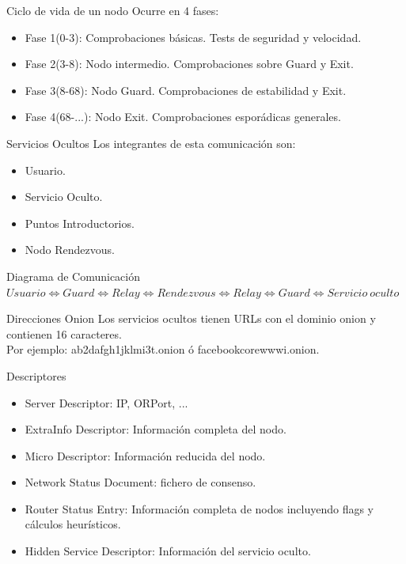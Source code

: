 \documentclass[10pt]{beamer}
\begin{document}
\begin{frame}[fragile]{Ciclo de vida de un nodo}
	\pause
	Ocurre en 4 fases:
	\pause
	\begin{itemize}
		\item<1-> Fase 1(0-3): Comprobaciones básicas. Tests de seguridad y velocidad.\pause
		\item<2-> Fase 2(3-8): Nodo intermedio. Comprobaciones sobre Guard y Exit.\pause
		\item<3-> Fase 3(8-68): Nodo Guard. Comprobaciones de estabilidad y Exit.\pause
		\item<4-> Fase 4(68-...): Nodo Exit. Comprobaciones esporádicas generales.\pause
	\end{itemize}
\end{frame}

\begin{frame}[fragile]{Servicios Ocultos}
	\pause
	Los integrantes de esta comunicación son:
	\pause
	\begin{itemize}
		\item<1-> Usuario.\pause
		\item<2-> Servicio Oculto.\pause
		\item<3-> Puntos Introductorios.\pause
		\item<4-> Nodo Rendezvous.\pause
	\end{itemize}
	\pause
	\begin{block}{Diagrama de Comunicación}
		\footnotesize $Usuario \Leftrightarrow Guard \Leftrightarrow Relay \Leftrightarrow Rendezvous \Leftrightarrow Relay \Leftrightarrow Guard \Leftrightarrow Servicio \ oculto$
	\end{block}
	\pause
	\begin{exampleblock}{Direcciones Onion}
		Los servicios ocultos tienen URLs con el dominio onion y contienen 16 caracteres.\\ Por ejemplo: ab2dafgh1jklmi3t.onion ó facebookcorewwwi.onion.
	\end{exampleblock}
\end{frame}

\begin{frame}[fragile]{Descriptores}
	\pause
	\begin{itemize}
		\item<1-> Server Descriptor: IP, ORPort, ... \pause
		\item<2-> ExtraInfo Descriptor: Información completa del nodo. \pause
		\item<3-> Micro Descriptor: Información reducida del nodo. \pause
		\item<4-> Network Status Document: fichero de consenso.\pause
		\item<5-> Router Status Entry: Información completa de nodos incluyendo flags y cálculos heurísticos.\pause
		\item<6-> Hidden Service Descriptor: Información del servicio oculto.\pause
	\end{itemize}
\end{frame}
\end{document}
